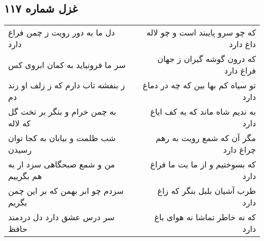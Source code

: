 \begin{center}
\section*{غزل شماره ۱۱۷}
\label{sec:sh117}
\begin{longtable}{l p{0.5cm} r}
دل ما به دور رویت ز چمن فراغ دارد
&&
که چو سرو پایبند است و چو لاله داغ دارد
\\
سر ما فرونیاید به کمان ابروی کس
&&
که درون گوشه گیران ز جهان فراغ دارد
\\
ز بنفشه تاب دارم که ز زلف او زند دم
&&
تو سیاه کم بها بین که چه در دماغ دارد
\\
به چمن خرام و بنگر بر تخت گل که لاله
&&
به ندیم شاه ماند که به کف ایاغ دارد
\\
شب ظلمت و بیابان به کجا توان رسیدن
&&
مگر آن که شمع رویت به رهم چراغ دارد
\\
من و شمع صبحگاهی سزد ار به هم بگرییم
&&
که بسوختیم و از ما بت ما فراغ دارد
\\
سزدم چو ابر بهمن که بر این چمن بگریم
&&
طرب آشیان بلبل بنگر که زاغ دارد
\\
سر درس عشق دارد دل دردمند حافظ
&&
که نه خاطر تماشا نه هوای باغ دارد
\\
\end{longtable}
\end{center}
